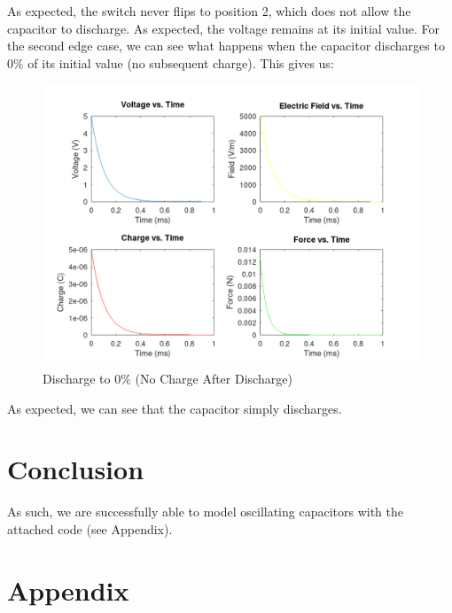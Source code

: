 As expected, the switch never flips to position 2, which does not allow the capacitor to discharge. As expected, the voltage remains at its initial value. For the second edge case, we can see what happens when the capacitor discharges to $0\%$ of its initial value (no subsequent charge). This gives us:

\begin{center}
  \begin{figure}[H]
    \centering
    \includegraphics[width=.9\textwidth]{Figures/OnlyDischarge.png}
    \caption{Discharge to $0\%$ (No Charge After Discharge)}
    \label{fig:5}
  \end{figure}
\end{center}

As expected, we can see that the capacitor simply discharges.

\section{Conclusion}

As such, we are successfully able to model oscillating capacitors with the attached code (see Appendix).

\newpage

\section{Appendix}







